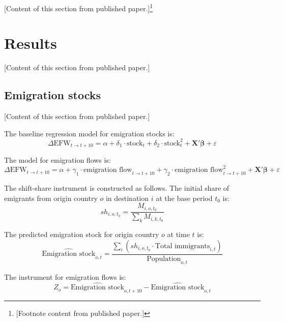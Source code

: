 \documentclass[12pt]{article}
\begin{document}
[Content of this section from published paper.]\footnote{[Footnote content from published paper.]}

\section{Results}
\label{sec:results}

[Content of this section from published paper.]

\subsection{Emigration stocks}
\label{sec:stocks}

[Content of this section from published paper.]

The baseline regression model for emigration stocks is:
\begin{equation}
\Delta \text{EFW}_{t \to t+10} = \alpha + \delta_1 \cdot \text{stock}_t + \delta_2 \cdot \text{stock}_t^2 + \mathbf{X}'\boldsymbol{\beta} + \varepsilon
\label{eq:stock}
\end{equation}

The model for emigration flows is:
\begin{equation}
\Delta \text{EFW}_{t \to t+10} = \alpha + \gamma_1 \cdot \text{emigration flow}_{t \to t+10} + \gamma_2 \cdot \text{emigration flow}^2_{t \to t+10} + \mathbf{X}'\boldsymbol{\beta} + \varepsilon
\label{eq:flow}
\end{equation}

The shift-share instrument is constructed as follows. The initial share of emigrants from origin country $o$ in destination $i$ at the base period $t_0$ is:
\begin{equation}
sh_{i,o,t_0} = \frac{M_{i,o,t_0}}{\sum_k M_{i,k,t_0}}
\label{eq:share}
\end{equation}

The predicted emigration stock for origin country $o$ at time $t$ is:
\begin{equation}
\widehat{\text{Emigration stock}}_{o,t} = \frac{\sum_i \left( sh_{i,o,t_0} \cdot \text{Total immigrants}_{i,t} \right)}{\text{Population}_{o,t}}
\label{eq:predicted_stock}
\end{equation}

The instrument for emigration flows is:
\begin{equation}
Z_o = \widehat{\text{Emigration stock}}_{o,t+10} - \widehat{\text{Emigration stock}}_{o,t}
\label{eq:instrument}
\end{equation}
\end{document}
